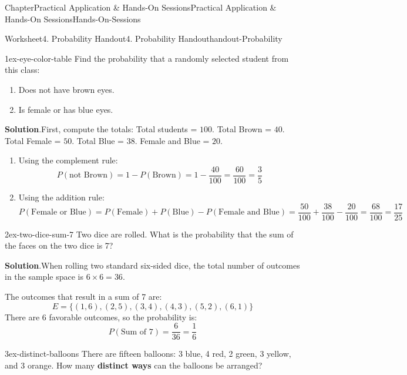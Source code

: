 \documentclass[oneside,10pt,]{book}
\newcommand{\blocktitlefont}{\relax}
\newcommand{\terminology}[1]{\textbf{#1}}
\begin{document}
\begin{chapterptx}{Chapter}{Practical Application \& Hands-On Sessions}{}{Practical Application \& Hands-On Sessions}{}{}{Hands-On-Sessions}
\begin{worksheet-section}{Worksheet}{4. Probability Handout}{}{4. Probability Handout}{}{}{handout-Probability}
\begin{divisionexercise}{1}{}{}{ex-eye-color-table}
Find the probability that a randomly selected student from this class:%
\begin{enumerate}[label={\alph*}]
\item{}Does not have brown eyes.%
\item{}Is female or has blue eyes.%
\end{enumerate}
%
\par\smallskip%
\noindent\textbf{\blocktitlefont Solution}.\hypertarget{ex-eye-color-table-2}{}\quad{}First, compute the totals: Total students = \(100\). Total Brown = \(40\). Total Female = \(50\). Total Blue = \(38\). Female and Blue = \(20\).%
\begin{enumerate}[label={\alph*}]
\item{}Using the complement rule:%
\begin{equation*}
P(\text{not Brown}) = 1 - P(\text{Brown}) = 1 - \frac{40}{100} = \frac{60}{100} = \frac{3}{5}
\end{equation*}
%
\item{}Using the addition rule:%
\begin{equation*}
P(\text{Female or Blue}) = P(\text{Female}) + P(\text{Blue}) - P(\text{Female and Blue}) = \frac{50}{100} + \frac{38}{100} - \frac{20}{100} = \frac{68}{100} = \frac{17}{25}
\end{equation*}
%
\end{enumerate}
%
\end{divisionexercise}%
\clearpage
\begin{divisionexercise}{2}{}{}{ex-two-dice-sum-7}%
Two dice are rolled. What is the probability that the sum of the faces on the two dice is 7?%
\par\smallskip%
\noindent\textbf{\blocktitlefont Solution}.\hypertarget{ex-two-dice-sum-7-2}{}\quad{}When rolling two standard six-sided dice, the total number of outcomes in the sample space is \(6 \times 6 = 36\).%
\par
The outcomes that result in a sum of 7 are:%
\begin{equation*}
E = \{(1,6), (2,5), (3,4), (4,3), (5,2), (6,1)\}
\end{equation*}
There are \(6\) favorable outcomes, so the probability is:%
\begin{equation*}
P(\text{Sum of 7}) = \frac{6}{36} = \frac{1}{6}
\end{equation*}
%
\end{divisionexercise}%
\begin{divisionexercise}{3}{}{}{ex-distinct-balloons}%
There are fifteen balloons: 3 blue, 4 red, 2 green, 3 yellow, and 3 orange. How many \terminology{distinct ways} can the balloons be arranged?%

\end{divisionexercise}
\end{worksheet-section}
\end{chapterptx}
\end{document}
